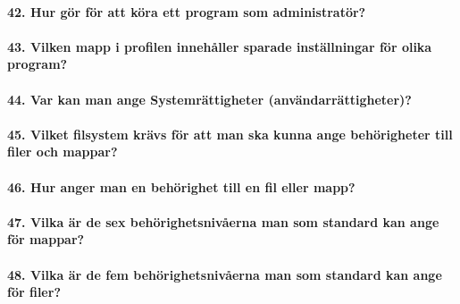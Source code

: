 \paragraph{42. Hur gör för att köra ett program som administratör?}

\paragraph{43. Vilken mapp i profilen innehåller sparade inställningar för olika program?}

\paragraph{44. Var kan man ange Systemrättigheter (användarrättigheter)?}

\paragraph{45. Vilket filsystem krävs för att man ska kunna ange behörigheter till filer och mappar?}

\paragraph{46. Hur anger man en behörighet till en fil eller mapp?} 

\paragraph{47. Vilka är de sex behörighetsnivåerna man som standard kan ange för mappar?}

\paragraph{48. Vilka är de fem behörighetsnivåerna man som standard kan ange för filer?}















